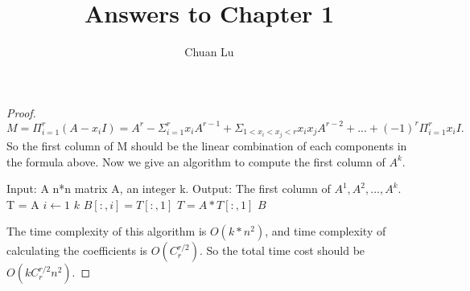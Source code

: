 \documentclass[12pt]{article}
\newenvironment{problem}[2][Problem]{\begin{trivlist}
\item[\hskip \labelsep {\bfseries #1}\hskip \labelsep {\bfseries #2.}]}{\end{trivlist}}
\begin{document}
 
\title{Answers to Chapter 1}
\author{Chuan Lu}
\maketitle
 
\begin{problem}{Page 13, P1.1.1}
\end{problem}
 
\begin{proof}
$M = \Pi_{i=1}^{r}(A-x_{i}I)=A^r-\Sigma_{i=1}^{r}x_{i}A^{r-1}+\Sigma_{1<x_i<x_j<r}x_ix_jA^{r-2}+...+(-1)^r\Pi_{i=1}^{r}x_iI.$\\
So the first column of M should be the linear combination of each components in the formula above. Now we give an algorithm to compute the first column of $A^k$.
\begin{codebox}
\zi Input: A n*n matrix A, an integer k.
\zi Output: The first column of $A^1, A^2, ..., A^k$.
\li T = A
\li \For $i \gets 1$ \To $k$
\li 	\Do
			$B[:, i] = T[:, 1]$
\li			$T = A*T[:, 1]$
		\End
\li \Return $B$
\end{codebox}
The time complexity of this algorithm is $O(k*n^2)$, and time complexity of calculating the coefficients is $O(C_{r}^{r/2})$. So the total time cost should be $O(kC_{r}^{r/2}n^2)$.
\end{proof}
\end{document}
